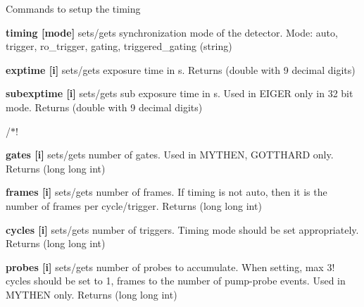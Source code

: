 Commands to setup the timing


\begin{DoxyItemize}
\item {\bfseries timing \mbox{[}mode\mbox{]}} sets/gets synchronization mode of the detector. Mode: auto, trigger, ro\_\-trigger, gating, triggered\_\-gating (string)
\end{DoxyItemize}


\begin{DoxyItemize}
\item {\bfseries exptime \mbox{[}i\mbox{]}} sets/gets exposure time in s. {\ttfamily Returns} {\ttfamily }(double with 9 decimal digits)
\end{DoxyItemize}


\begin{DoxyItemize}
\item {\bfseries subexptime \mbox{[}i\mbox{]}} sets/gets sub exposure time in s. Used in EIGER only in 32 bit mode. {\ttfamily Returns} {\ttfamily }(double with 9 decimal digits)
\end{DoxyItemize}

/$\ast$!


\begin{DoxyItemize}
\item {\bfseries gates \mbox{[}i\mbox{]}} sets/gets number of gates. Used in MYTHEN, GOTTHARD only. {\ttfamily Returns} {\ttfamily }(long long int)
\end{DoxyItemize}


\begin{DoxyItemize}
\item {\bfseries frames \mbox{[}i\mbox{]}} sets/gets number of frames. If {\ttfamily timing} is not {\ttfamily auto}, then it is the number of frames per cycle/trigger. {\ttfamily Returns} {\ttfamily }(long long int)
\end{DoxyItemize}


\begin{DoxyItemize}
\item {\bfseries cycles \mbox{[}i\mbox{]}} sets/gets number of triggers. Timing mode should be set appropriately. {\ttfamily Returns} {\ttfamily }(long long int)
\end{DoxyItemize}


\begin{DoxyItemize}
\item {\bfseries probes \mbox{[}i\mbox{]}} sets/gets number of probes to accumulate. When setting, max 3! cycles should be set to 1, frames to the number of pump-\/probe events. Used in MYTHEN only. {\ttfamily Returns} {\ttfamily }(long long int)
\end{DoxyItemize}


